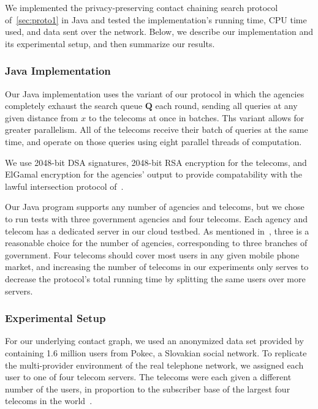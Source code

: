 \label{sec:implementation}

We implemented the privacy-preserving contact chaining search protocol of~\ref{sec:proto1} in Java and tested the implementation's running time, CPU time used, and data sent over the network. Below, we describe our implementation and its experimental setup, and then summarize our results.

\subsubsection{Java Implementation}

Our Java implementation uses the variant of our protocol in which the agencies completely exhaust the search queue $\mathbf{Q}$ each round, sending all queries at any given distance from $x$ to the telecoms at once in batches. Ths variant allows for greater parallelism. All of the telecoms receive their batch of queries at the same time, and operate on those queries using eight parallel threads of computation.



We use 2048-bit DSA signatures, 2048-bit RSA encryption for the telecoms, and ElGamal encryption for the agencies' output to provide compatability with the lawful intersection protocol of~\cite{sff-foci2014}.



Our Java program supports any number of agencies and telecoms, but we chose to run tests with three government agencies and four telecoms. Each agency and telecom has a dedicated server in our cloud testbed. As mentioned in~\cite{sff-foci2014}, three is a reasonable choice for the number of agencies, corresponding to three branches of government. Four telecoms should cover most users in any given mobile phone market, and increasing the number of telecoms in our experiments only serves to decrease the protocol's total running time by splitting the same users over more servers.



\subsubsection{Experimental Setup}

For our underlying contact graph, we used an anonymized data set provided by~\cite{snapnets} containing 1.6 million users from Pokec, a Slovakian social network. To replicate the multi-provider environment of the real telephone network, we assigned each user to one of four telecom servers. The telecoms were each given a different number of the users, in proportion to the subscriber base of the largest four telecoms in the world~\cite{mobiforge}.



